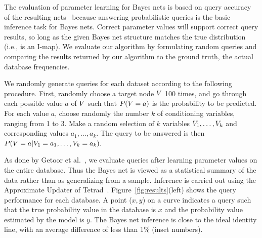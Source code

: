 \documentclass[oribibl]{llncs}
\begin{document}
The evaluation of parameter learning for Bayes nets is based on query accuracy of the resulting nets~\cite{Allen2008} because
answering probabilistic queries is the basic inference task for Bayes nets. Correct parameter values will support correct query results, so long as the given Bayes net structure matches the true distribution (i.e., is an I-map).  We evaluate our algorithm by formulating random queries and comparing the results returned by our algorithm to the ground truth, the actual database frequencies.

We randomly generate queries for each dataset according to the following procedure. First, randomly choose a target node $V$ 100 times, and go through each possible value $a$ of $V$ such that $P(V=a)$ is the probability to be predicted. For each value $a$, choose randomly the number $k$ of conditioning variables, ranging from 1 to 3. Make a random selection of $k$ variables $V_{1},\ldots,V_{k}$ and corresponding values $a_{1},\ldots,a_{k}$. The query to be answered is then $P(V=a|V_{1} = a_{1},\ldots,V_{k}= a_{k}).$


As done by Getoor et al.~\cite{Getoor2001}, we evaluate queries after learning parameter values on the entire database. 
Thus the Bayes net is viewed as a statistical summary of the data rather than as generalizing from a sample. Inference is carried out using the Approximate Updater of Tetrad~\cite{2008a}.
Figure~\ref{fig:results}(left) shows the query performance for each database.
A point ($x,y$) on a curve indicates a query such that the true probability value in the database is $x$ and the probability value estimated by the model is $y$. 
%
The Bayes net inference is close to the ideal identity line, with an average difference of less than 1\% (inset numbers).
%
\end{document}
